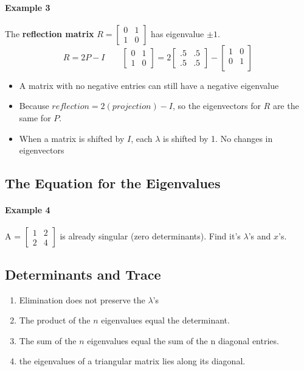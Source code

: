 \documentclass{article}
\begin{document}
\paragraph{Example 3}
The \textbf{reflection matrix} $R = \begin{bmatrix} 0 & 1 \\ 1 & 0
	\end{bmatrix}$ has eigenvalue $\pm 1$.
\[
	R = 2P - I
	\qquad
	\begin{bmatrix}
		0 & 1 \\
		1 & 0
	\end{bmatrix}
	= 2
	\begin{bmatrix}
		.5 & .5 \\
		.5 & .5
	\end{bmatrix}
	-
	\begin{bmatrix}
		1 & 0 \\
		0 & 1 \\
	\end{bmatrix}
\]
\begin{itemize}
	\item A matrix with no negative entries can still have a negative eigenvalue
	\item Because $reflection = 2(projection) - I$, so the eigenvectors for $R$ are the same for $P$.
	\item When a matrix is shifted by $I$, each $\lambda$ is shifted by 1. No changes in eigenvectors
\end{itemize}

\subsection{The Equation for the Eigenvalues}

\paragraph{Example 4}
A = $\begin{bmatrix} 1 & 2 \\ 2 & 4 \end{bmatrix}$ is already singular (zero determinants). Find it's $\lambda$'s and $x$'s.

\subsection{Determinants and Trace}

\begin{enumerate}
	\item Elimination does not preserve the $\lambda$'s
	\item The product of the $n$ eigenvalues equal the determinant.
	\item The sum of the $n$ eigenvalues equal the sum of the n diagonal entries.
	\item the eigenvalues of a triangular matrix lies along its diagonal.
\end{enumerate}
\end{document}
